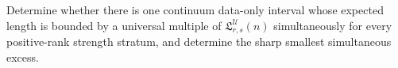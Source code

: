 Determine whether there is one continuum data-only interval whose expected length is bounded by a universal multiple of \(\mathfrak L_{r,s}^{\mathcal U}(n)\) simultaneously for every positive-rank strength stratum, and determine the sharp smallest simultaneous excess.